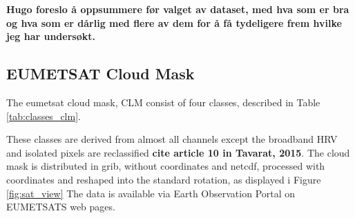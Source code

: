 
\textbf{Hugo foreslo å oppsummere før valget av dataset, med hva som er bra og hva som er dårlig med flere av dem for å få tydeligere frem hvilke jeg har undersøkt.}

\subsection{EUMETSAT Cloud Mask} \label{sec:EUMETSAT_cloud_mask}
The \acrshort{eumetsat} cloud mask, CLM consist of four classes, described in Table \ref{tab:classes_clm}.


These classes are derived from almost all channels except the broadband HRV and isolated pixels are reclassified \textbf{cite article 10 in Tavarat, 2015}. The cloud mask is distributed in \acrfull{grib},  without coordinates and \acrfull{netcdf}, processed with coordinates and reshaped into the standard rotation, as displayed i Figure \ref{fig:sat_view} The data is available via Earth Observation Portal on EUMETSATS web pages. 
